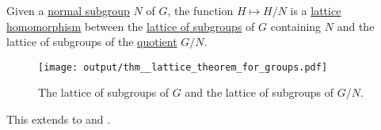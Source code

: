 \begin{theorem}\label{thm:quotient_subgroup_lattice_theorem}
  Given a \hyperref[thm:normal_subgroup_equivalences]{normal subgroup} \( N \) of \( G \), the function \( H \mapsto H / N \) is a \hyperref[def:semilattice/homomorphism]{lattice homomorphism} between the \hyperref[thm:substructures_form_complete_lattice]{lattice of subgroups} of \( G \) containing \( N \) and the lattice of subgroups of the \hyperref[def:group/quotient]{quotient} \( G / N \).

  \begin{figure}[h]
    \centering
    \texttt{[image: output/thm\_\_lattice\_theorem\_for\_groups.pdf]}
    \caption{The lattice of subgroups of \( G \) and the lattice of subgroups of \( G / N \).}
    \label{fig:thm:quotient_subgroup_lattice_theorem}
  \end{figure}

  This extends to  and .
\end{theorem}
